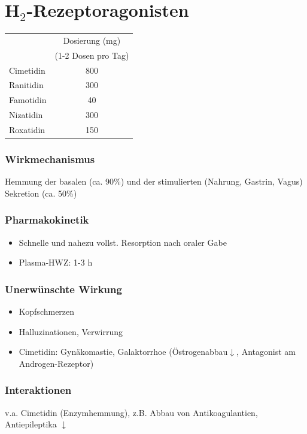 \documentclass[10pt,a4paper]{report}
\begin{document}
\section{H$_2$-Rezeptoragonisten} %
\label{sec:h__2_rezeptoragonisten}
\begin{tabularx}{\textwidth}{lc}
&Dosierung (mg)\\
&(1-2 Dosen pro Tag)\\
Cimetidin&800\\
Ranitidin&300\\
Famotidin&40\\
Nizatidin&300\\
Roxatidin&150\\
\end{tabularx}
\subsubsection{Wirkmechanismus} %
\label{ssub:wirkmechanismus}
Hemmung der basalen (ca. 90\%) und der stimulierten (Nahrung, Gastrin, Vagus) Sekretion (ca. 50\%)
\subsubsection{Pharmakokinetik} %
\label{ssub:pharmakokinetik}
\begin{itemize}
	\item Schnelle und nahezu vollst. Resorption nach oraler Gabe
	\item Plasma-HWZ: 	1-3 h
\end{itemize}
\subsubsection{Unerwünschte Wirkung} %
\label{ssub:unerw_nschte_wirkung}
\begin{itemize}
	\item Kopfschmerzen
	\item Halluzinationen, Verwirrung
	\item Cimetidin: Gynäkomastie, Galaktorrhoe (Östrogenabbau$\downarrow$, Antagonist am Androgen-Rezeptor)
\end{itemize}
\subsubsection{Interaktionen} %
\label{ssub:interaktionen}
v.a. Cimetidin (Enzymhemmung), z.B. Abbau von Antikoagulantien, Antiepileptika $\downarrow$
\end{document}
